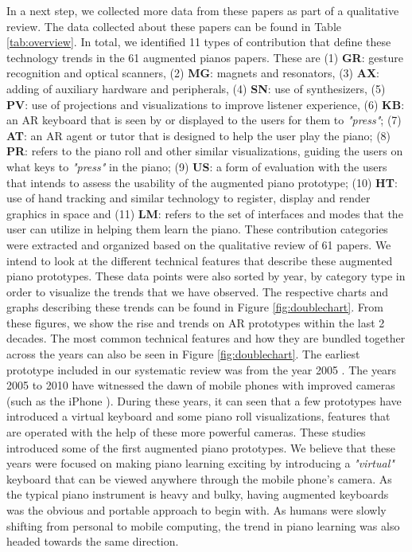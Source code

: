 \documentclass[sigconf, screen, review]{acmart}
\begin{document}
In a next step, we collected more data from these papers as part of a qualitative review. The data collected about these papers can be found in Table \ref{tab:overview}. In total, we identified 11 types of contribution that define these technology trends in the 61 augmented pianos papers. These are (1) \textbf{GR}: gesture recognition and optical scanners, (2) \textbf{MG}: magnets and resonators, (3) \textbf{AX}: adding of auxiliary hardware and peripherals, (4) \textbf{SN}: use of synthesizers, (5) \textbf{PV}: use of projections and visualizations to improve listener experience, (6) \textbf{KB}: an AR keyboard that is seen by or displayed to the users for them to \textit{"press"}; (7) \textbf{AT}: an AR agent or tutor that is designed to help the user play the piano; (8) \textbf{PR}: refers to the piano roll and other similar visualizations, guiding the users on what keys to  \textit{"press"} in the piano; (9) \textbf{US}: a form of evaluation with the users that intends to assess the usability of the augmented piano prototype; (10) \textbf{HT}: use of hand tracking and similar technology to register, display and render graphics in space and (11) \textbf{LM}: refers to the set of interfaces and modes that the user can utilize in helping them learn the piano. These contribution categories were extracted and organized based on the qualitative review of 61 papers. We intend to look at the different technical features that describe these augmented piano prototypes. These data points were also sorted by year, by category type in order to visualize the trends that we have observed. The respective charts and graphs describing these trends can be found in Figure \ref{fig:doublechart}. From these figures, we show the rise and trends on AR prototypes within the last 2 decades. The most common technical features and how they are bundled together across the years can also be seen in Figure \ref{fig:doublechart}. The earliest prototype included in our systematic review was from the year 2005 \cite{barakonyi2005augmented}. The years 2005 to 2010 have witnessed the dawn of mobile phones with improved cameras (such as the iPhone \cite{querashi2012apple}). During these years, it can seen that a few prototypes have introduced a virtual keyboard and some piano roll visualizations, features that are operated with the help of these more powerful cameras. These studies \cite{barakonyi2005augmented, schmalstieg2007experiences, correa2009computer, mcpherson2010augmenting, mcpherson2010toward, zhang2010affordable} introduced some of the first augmented piano prototypes. We believe that these years were focused on making piano learning exciting by introducing a \textit{"virtual"} keyboard that can be viewed anywhere through the mobile phone's camera. As the typical piano instrument is heavy and bulky, having augmented keyboards was the obvious and portable approach to begin with. As humans were slowly shifting from personal to mobile computing, the trend in piano learning was also headed towards the same direction. 
\end{document}

